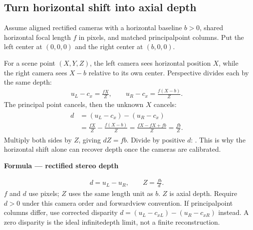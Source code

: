 \documentclass[letterpaper,11pt,english,openany,oneside]{jupyterBook}
\begin{document}
\subsection{Turn horizontal shift into axial depth}
\label{\detokenize{lectures/lecture04/stereo:turn-horizontal-shift-into-axial-depth}}\label{\detokenize{lectures/lecture04/stereo:stereo-derive-depth}}\label{\detokenize{lectures/lecture04/stereo:index-2}}\label{\detokenize{lectures/lecture04/stereo:index-1}}\label{\detokenize{lectures/lecture04/stereo:index-0}}
\sphinxAtStartPar
Assume aligned rectified cameras with a horizontal baseline \(b>0\), shared horizontal focal length \(f\) in pixels, and matched principal\sphinxhyphen{}point columns. Put the left center at \((0,0,0)\) and the right center at \((b,0,0)\).

\sphinxAtStartPar
For a scene point \((X,Y,Z)\), the left camera sees horizontal position \(X\), while the right camera sees \(X-b\) relative to its own center. Perspective divides each by the same depth:
\begin{equation*}
\begin{split}u_L-c_x=\frac{fX}{Z},\qquad u_R-c_x=\frac{f(X-b)}{Z}.\end{split}
\end{equation*}
\sphinxAtStartPar
{} The principal point cancels, then the unknown \(X\) cancels:
\begin{equation*}
\begin{split}
\begin{aligned}
d&=(u_L-c_x)-(u_R-c_x)\\
&=\frac{fX}{Z}-\frac{f(X-b)}{Z}
=\frac{fX-fX+fb}{Z}=\frac{fb}{Z}.
\end{aligned}
\end{split}
\end{equation*}
\sphinxAtStartPar
Multiply both sides by \(Z\), giving \(dZ=fb\). Divide by positive \(d\): . This is why the horizontal shift alone can recover depth once the cameras are calibrated.

\begin{TextbookBox}
\textbf{Formula — rectified stereo depth}\par\smallskip
\begin{equation}\label{equation:lectures/lecture04/stereo:eq-lec04-depth}
\begin{split}d=u_L-u_R,\qquad Z=\frac{fb}{d}.\end{split}
\end{equation}
\sphinxAtStartPar
\(f\) and \(d\) use pixels; \(Z\) uses the same length unit as \(b\). \(Z\) is axial depth. Require \(d>0\) under this camera order and forward\sphinxhyphen{}view convention. If principal\sphinxhyphen{}point columns differ, use corrected disparity \(d=(u_L-c_{xL})-(u_R-c_{xR})\) instead. A zero disparity is the ideal infinite\sphinxhyphen{}depth limit, not a finite reconstruction.

\end{TextbookBox}
\end{document}
